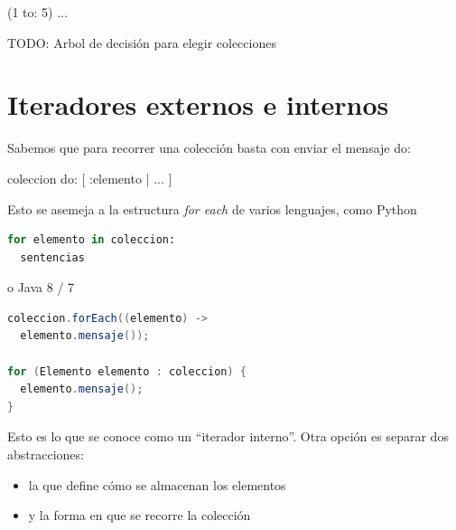 \documentclass[a4paper,12pt]{book}
\begin{document}
\begin{code}
(1 to: 5) ...
\end{code}

TODO: Arbol de decisión para elegir colecciones

\section{Iteradores externos e internos}

Sabemos que para recorrer una colección basta con enviar el mensaje do: 

\begin{code}
coleccion do: [ :elemento | ... ]
\end{code}

Esto se asemeja a la estructura \textit{for each} de varios lenguajes, como Python

\begin{lstlisting}[language=Python]  
for elemento in coleccion:
  sentencias
\end{lstlisting}

o Java 8 / 7
\begin{lstlisting}[language=Java]  
coleccion.forEach((elemento) ->
  elemento.mensaje());
  
for (Elemento elemento : coleccion) {
  elemento.mensaje();
}
\end{lstlisting}

Esto es lo que se conoce como un ``iterador interno''. Otra opción es separar dos abstracciones:

\begin{itemize}
 \item la que define cómo se almacenan los elementos
 \item y la forma en que se recorre la colección
\end{itemize}
\end{document}
